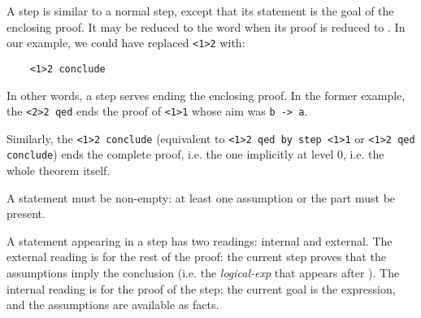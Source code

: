 \begin{syn}
 \is
      
\alt{} 
\end{syn}


A  step is similar to a normal step, except that its
statement is the goal of the enclosing proof.  It may be reduced to
the word  when its proof is reduced to
. In our example, we could have replaced
\verb"<1>2" with:
\begin{verbatim}
    <1>2 conclude
\end{verbatim}
In other words, a  step serves ending the enclosing
proof. In the former example, the \verb"<2>2 qed" ends the proof of 
\verb"<1>1" whose aim was \verb"b -> a".

Similarly, the \verb"<1>2 conclude" (equivalent to
\verb"<1>2 qed by step <1>1" or \verb"<1>2 qed conclude") ends the
complete proof, i.e. the one implicitly at level 0, i.e. the whole theorem itself.

\begin{syn}
 \is
\end{syn}

A statement must be non-empty: at least one assumption or the
 part must be present.

A statement appearing in a step has two readings: internal and
external.  The external reading is for the rest of the
proof: the current step proves that the assumptions imply the
conclusion (i.e. the {\em logical-exp} that appears after
).  The internal reading is for the proof of the step:
the current goal is the  expression, and the
assumptions are available as facts.

\begin{syn}
 \is
      \tok{ :} 
\alt{}  \tok{ :} 
\alt{}  \tok{ =} 
\end{syn}

